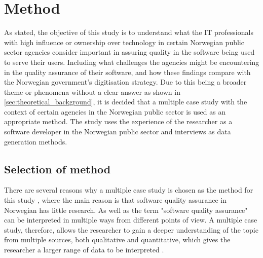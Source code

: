 \chapter{Method} \label{sec:method}


As stated, the objective of this study is to understand what the IT professionals with high influence or ownership over technology in certain Norwegian public sector agencies consider important in assuring quality in the software being used to serve their users. Including what challenges the agencies might be encountering in the quality assurance of their software, and how these findings compare with the Norwegian government's digitisation strategy. Due to this being a broader theme or phenomena \cite{bjo_2022} without a clear answer as shown in \autoref{sec:theoretical_background}, it is decided that a multiple case study with the context of certain agencies in the Norwegian public sector is used as an appropriate method. The study uses the experience of the researcher as a software developer in the Norwegian public sector and interviews as data generation methods.

\section{Selection of method}
There are several reasons why a multiple case study is chosen as the method for this study \cite{bjo_2022}, where the main reason is that software quality assurance in Norwegian has little research. As well as the term "software quality assurance" can be interpreted in multiple ways from different points of view. A multiple case study, therefore, allows the researcher to gain a deeper understanding of the topic from multiple sources, both qualitative and quantitative, which gives the researcher a larger range of data to be interpreted \cite{bjo_2022}.

